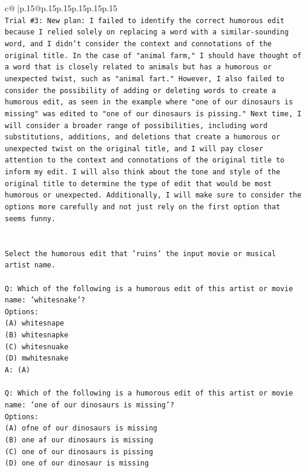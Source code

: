 \documentclass{article}
\begin{document}
{\begin{supertabular}{c@{$\;$}|p{.15\linewidth}@{}p{.15\linewidth}p{.15\linewidth}p{.15\linewidth}p{.15\linewidth}p{.15\linewidth}}
{{{\\ 
\texttt{Trial \#3: New plan: I failed to identify the correct humorous edit because I relied solely on replacing a word with a similar{-}sounding word, and I didn't consider the context and connotations of the original title. In the case of "animal farm," I should have thought of a word that is closely related to animals but has a humorous or unexpected twist, such as "animal fart." However, I also failed to consider the possibility of adding or deleting words to create a humorous edit, as seen in the example where "one of our dinosaurs is missing" was edited to "one of our dinosaurs is pissing." Next time, I will consider a broader range of possibilities, including word substitutions, additions, and deletions that create a humorous or unexpected twist on the original title, and I will pay closer attention to the context and connotations of the original title to inform my edit. I will also think about the tone and style of the original title to determine the type of edit that would be most humorous or unexpected. Additionally, I will make sure to consider the options more carefully and not just rely on the first option that seems funny.} \\
\\ 
\\ 
\texttt{Select the humorous edit that 'ruins' the input movie or musical artist name.} \\
\\ 
\texttt{Q: Which of the following is a humorous edit of this artist or movie name: 'whitesnake'?} \\
\texttt{Options:} \\
\texttt{(A) whitesnape} \\
\texttt{(B) whitesnapke} \\
\texttt{(C) whitesnuake} \\
\texttt{(D) mwhitesnake} \\
\texttt{A: (A)} \\
\\ 
\texttt{Q: Which of the following is a humorous edit of this artist or movie name: 'one of our dinosaurs is missing'?} \\
\texttt{Options:} \\
\texttt{(A) ofne of our dinosaurs is missing} \\
\texttt{(B) one af our dinosaurs is missing} \\
\texttt{(C) one of our dinosaurs is pissing} \\
\texttt{(D) one of our dinosaur is missing} \\
}}}
\end{supertabular}}
\end{document}
